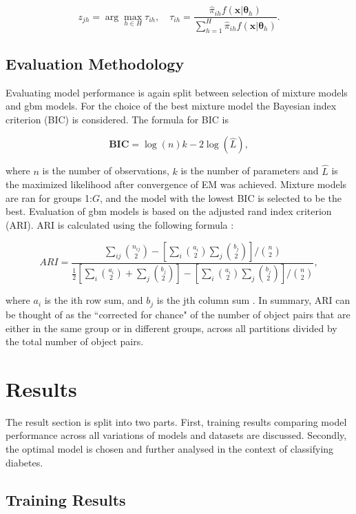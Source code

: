 \documentclass[11pt,letterpaper]{article}
\begin{document}
$$z_{jh} = \arg \max_{h \in H} \tau_{ih}  , \quad \tau_{ih} = \frac{\hat{\pi}_{ih}  f(\bm{x}| \bm{\theta}_h)  }{ \sum_{h=1}^H \hat{\pi}_{ih}  f(\bm{x}| \bm{\theta}_h) }. $$


                       

\subsection{Evaluation Methodology}
Evaluating model performance is again split between selection of mixture models and gbm models. For the choice of the best mixture model the Bayesian index criterion (BIC) is considered. The formula for BIC is 

$$\textbf{BIC} = \log(n) k - 2 \log(\hat{L}), $$

where $n$ is the number of observations, $k$ is the number of parameters and  $\hat{L}$ is the maximized likelihood after convergence of EM was achieved.  Mixture models are ran for groups 1:$G$, and the model with the lowest BIC is selected to be the best.  
Evaluation of gbm models is based on the adjusted rand index criterion (ARI). ARI is calculated using the following formula :


$$ARI = \frac{ \sum_{ij} \binom{n_{ij}}{2} - [\sum_i \binom{a_i}{2} \sum_j \binom{b_j}{2}] / \binom{n}{2} }{ \frac{1}{2} [\sum_i \binom{a_i}{2} + \sum_j \binom{b_j}{2}] - [\sum_i \binom{a_i}{2} \sum_j \binom{b_j}{2}] / \binom{n}{2} }, $$

where $a_i$ is the ith row sum, and $b_j$ is the jth column sum \cite{mixdist}.  In summary, ARI can be thought of as the ``corrected for chance" of the number of object pairs that are either in the same group or in different groups, across all partitions divided by the total number of object pairs.

\section{Results}

The result section is split into two parts. First, training results comparing model performance across all variations of models and datasets are discussed. Secondly, the optimal model is chosen and further analysed in the context of classifying diabetes. 

\subsection{Training Results}
\end{document}
